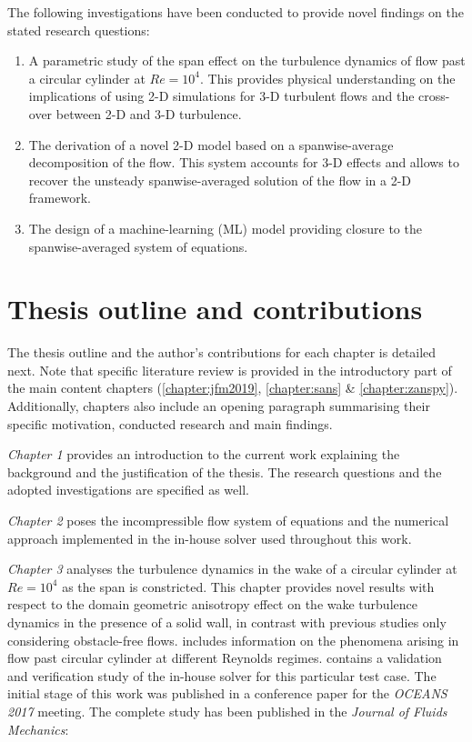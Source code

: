 \documentclass[../main.tex]{subfiles}
\begin{document}
The following investigations have been conducted to provide novel findings on the stated research questions:

\begin{enumerate}
	\item A parametric study of the span effect on the turbulence dynamics of flow past a circular cylinder at $Re=10^4$.
This provides physical understanding on the implications of using 2-D simulations for 3-D turbulent flows and the cross-over between 2-D and 3-D turbulence.
	\item The derivation of a novel 2-D model based on a spanwise-average decomposition of the flow.
This system accounts for 3-D effects and allows to recover the unsteady spanwise-averaged solution of the flow in a 2-D framework.
	\item The design of a machine-learning (ML) model providing closure to the spanwise-averaged system of equations.
\end{enumerate}

\section{Thesis outline and contributions}

The thesis outline and the author's contributions for each chapter is detailed next.
Note that specific literature review is provided in the introductory part of the main content chapters (\cref{chapter:jfm2019}, \cref{chapter:sans} \& \cref{chapter:zanspy}).
Additionally, chapters also include an opening paragraph summarising their specific motivation, conducted research and main findings.

\textit{Chapter 1} provides an introduction to the current work explaining the background and the justification of the thesis.
The research questions and the adopted investigations are specified as well.

\textit{Chapter 2} poses the incompressible flow system of equations and the numerical approach implemented in the in-house solver used throughout this work.

\textit{Chapter 3} analyses the turbulence dynamics in the wake of a circular cylinder at $Re=10^4$ as the span is constricted.
This chapter provides novel results with respect to the domain geometric anisotropy effect on the wake turbulence dynamics in the presence of a solid wall, in contrast with previous studies only considering obstacle-free flows.
 includes information on the phenomena arising in flow past circular cylinder at different Reynolds regimes.
 contains a validation and verification study of the in-house solver for this particular test case.
The initial stage of this work was published in a conference paper for the \textit{OCEANS 2017} meeting.
The complete study has been published in the \textit{Journal of Fluids Mechanics}:
\end{document}
